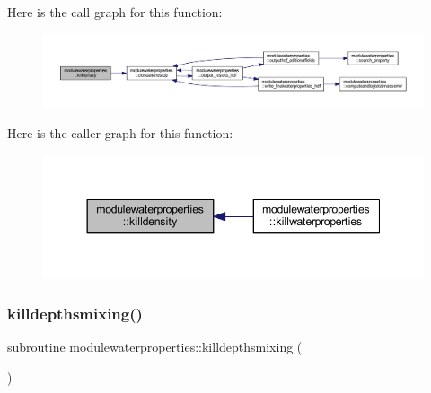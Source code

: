Here is the call graph for this function\+:\nopagebreak
\begin{figure}[H]
\begin{center}
\leavevmode
\includegraphics[width=350pt]{namespacemodulewaterproperties_aa8cc31da812d7fc89d0dcc1d1fafac2f_cgraph}
\end{center}
\end{figure}
Here is the caller graph for this function\+:\nopagebreak
\begin{figure}[H]
\begin{center}
\leavevmode
\includegraphics[width=344pt]{namespacemodulewaterproperties_aa8cc31da812d7fc89d0dcc1d1fafac2f_icgraph}
\end{center}
\end{figure}
\mbox{\label{namespacemodulewaterproperties_a75dba19ef36b16b901b8d7bab39b00bc}} 
\subsubsection{\texorpdfstring{killdepthsmixing()}{killdepthsmixing()}}
{\footnotesize\ttfamily subroutine modulewaterproperties\+::killdepthsmixing (\begin{DoxyParamCaption}{ }\end{DoxyParamCaption})\hspace{0.3cm}{\ttfamily [private]}}

